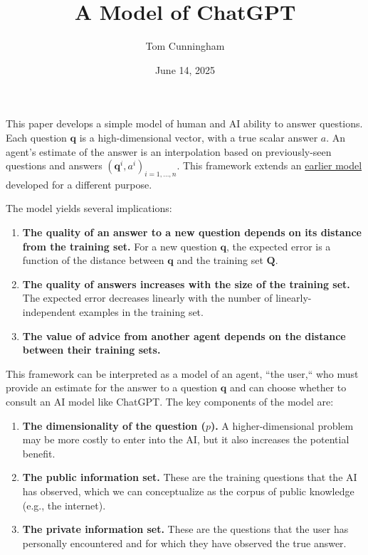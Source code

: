 \documentclass[11pt]{article}
\title{A Model of ChatGPT}
\author{Tom Cunningham}
\date{June 14, 2025}
\begin{document}
\maketitle

This paper develops a simple model of human and AI ability to answer questions. Each question $\bm{q}$ is a high-dimensional vector, with a true scalar answer $a$. An agent's estimate of the answer is an interpolation based on previously-seen questions and answers $(\bm{q}^i,a^i)_{i=1,\ldots,n}$. This framework extends an \href{https://tecunningham.github.io/posts/2023-09-05-model-of-ai-imitation.html}{earlier model} developed for a different purpose.

The model yields several implications:
\begin{enumerate}
  \item \textbf{The quality of an answer to a new question depends on its distance from the training set.} For a new question $\bm{q}$, the expected error is a function of the distance between $\bm{q}$ and the training set $\bm{Q}$.
  \item \textbf{The quality of answers increases with the size of the training set.} The expected error decreases linearly with the number of linearly-independent examples in the training set.
  \item \textbf{The value of advice from another agent depends on the distance between their training sets.}
\end{enumerate}

This framework can be interpreted as a model of an agent, ``the user,`` who must provide an estimate for the answer to a question $\bm{q}$ and can choose whether to consult an AI model like ChatGPT. The key components of the model are:
\begin{enumerate}[label=\arabic*., leftmargin=2em]
  \item \textbf{The dimensionality of the question ($p$).} A higher-dimensional problem may be more costly to enter into the AI, but it also increases the potential benefit.
  \item \textbf{The public information set.} These are the training questions that the AI has observed, which we can conceptualize as the corpus of public knowledge (e.g., the internet).
  \item \textbf{The private information set.} These are the questions that the user has personally encountered and for which they have observed the true answer.
\end{enumerate}
\end{document}
